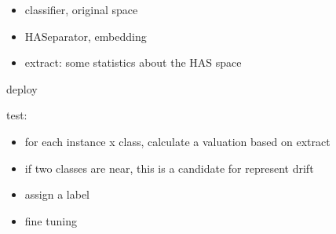 %
\begin{itemize}
\item classifier, original space
\item HASeparator, embedding
\item extract: some statistics about the HAS space
\end{itemize}

deploy

test:
%
\begin{itemize}
\item for each instance x class, calculate a valuation based on extract
\item if two classes are near, this is a candidate for represent drift
\item assign a label
\item fine tuning
\end{itemize}

